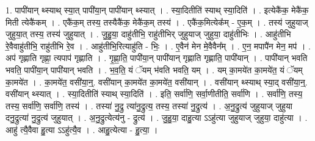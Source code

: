 \documentclass[17pt]{extarticle}
\begin{document}
1. पापी॑यान् थ्स्याथ् स्या॒त् पापी॑या॒न् पापी॑यान् थ्स्यात् । . स्या॒दितीति॑ स्याथ् स्या॒दिति॑ । . इत्येकै॑क॒ मेकै॑क॒ मिती त्येकै॑कम् । . एकै॑क॒म् तस्य॒ तस्यैकै॑क॒ मेकै॑क॒म् तस्य॑ । . एकै॑क॒मित्येक᳚म् - ए॒क॒म् । . तस्य॑ जुहुयाज् जुहुया॒त् तस्य॒ तस्य॑ जुहुयात् । . जु॒हु॒या॒ दाहु॑तीभि॒ राहु॑तीभिर् जुहुयाज् जुहुया॒ दाहु॑तीभिः । . आहु॑तीभि रे॒वैवाहु॑तीभि॒ राहु॑तीभि रे॒व । . आहु॑तीभि॒रित्याहु॑ति - भिः॒ । . ए॒वैन॑ मेन मे॒वैवैन᳚म् । . ए॒न॒ मपापै॑न मेन॒ मप॑ । . अप॑ गृह्णाति गृह्णा॒ त्यपाप॑ गृह्णाति । . गृ॒ह्णा॒ति॒ पापी॑या॒न् पापी॑यान् गृह्णाति गृह्णाति॒ पापी॑यान् । . पापी॑यान् भवति भवति॒ पापी॑या॒न् पापी॑यान् भवति । . भ॒व॒ति॒ यं ॅयम् भ॑वति भवति॒ यम् । . यम् का॒मये॑त का॒मये॑त॒ यं ॅयम् का॒मये॑त । . का॒मये॑त॒ वसी॑या॒न्॒. वसी॑यान् का॒मये॑त का॒मये॑त॒ वसी॑यान् । . वसी॑यान् थ्स्याथ् स्या॒द् वसी॑या॒न्॒. वसी॑यान् थ्स्यात् । . स्या॒दितीति॑ स्याथ् स्या॒दिति॑ । . इति॒ सर्वा॑णि॒ सर्वा॒णीतीति॒ सर्वा॑णि । . सर्वा॑णि॒ तस्य॒ तस्य॒ सर्वा॑णि॒ सर्वा॑णि॒ तस्य॑ । . तस्या॑ नु॒द्रु त्या॑नु॒द्रुत्य॒ तस्य॒ तस्या॑ नु॒द्रुत्य॑ । . अ॒नु॒द्रुत्य॑ जुहुयाज् जुहुया दनु॒द्रुत्या॑ नु॒द्रुत्य॑ जुहुयात् । . अ॒नु॒द्रुत्येत्य॑नु - द्रुत्य॑ । . जु॒हु॒या॒ दाहु॒त्या ऽऽहु॑त्या जुहुयाज् जुहुया॒ दाहु॑त्या । . आहु॑ त्यै॒वैवा हु॒त्या ऽऽहु॑त्यै॒व । . आहु॒त्येत्या - हु॒त्या॒ । \newline
\end{document}
